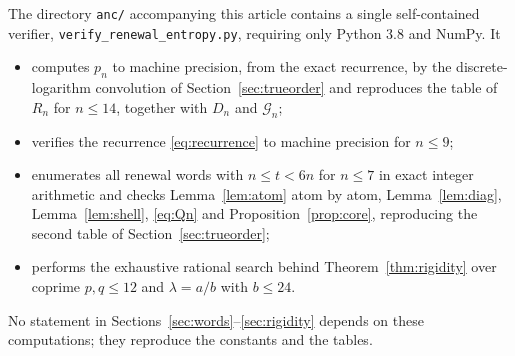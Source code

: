 \documentclass[11pt,reqno]{amsart}
\theoremstyle{plain}
\theoremstyle{definition}
\theoremstyle{remark}
\begin{document}
The directory \texttt{anc/} accompanying this article contains a single
self-contained verifier, \texttt{verify\_renewal\_entropy.py}, requiring
only Python 3.8 and NumPy. It

\begin{itemize}\itemsep2pt
\item computes $p_n$ to machine precision, from the exact recurrence, by
the discrete-logarithm convolution of
Section~\ref{sec:trueorder} and reproduces the table of $R_n$ for
$n\le14$, together with $D_n$ and $\mathcal G_n$;
\item verifies the recurrence \eqref{eq:recurrence} to machine precision
for $n\le9$;
\item enumerates all renewal words with $n\le t<6n$ for $n\le7$ in exact
integer arithmetic and checks Lemma~\ref{lem:atom} atom by atom,
Lemma~\ref{lem:diag}, Lemma~\ref{lem:shell}, \eqref{eq:Qn} and
Proposition~\ref{prop:core}, reproducing the second table of
Section~\ref{sec:trueorder};
\item performs the exhaustive rational search behind
Theorem~\ref{thm:rigidity} over coprime $p,q\le12$ and $\lambda=a/b$ with
$b\le24$.
\end{itemize}

No statement in Sections~\ref{sec:words}--\ref{sec:rigidity} depends on
these computations; they reproduce the constants and the tables.
\end{document}
